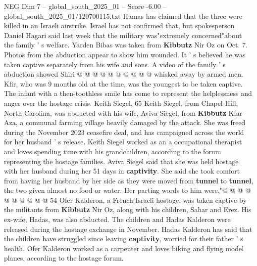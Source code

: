 \begin{textsample}{NEG Dim 7 – global\_south\_2025\_01 – Score -6.00 – global\_south\_2025\_01/120700115.txt}
Hamas has claimed that the three were killed in an Israeli airstrike.
Israel has not confirmed that, but spokesperson Daniel Hagari said last week that the military was"extremely concerned"about the family ' s welfare.
Yarden Bibas was taken from \textbf{Kibbutz} Nir Oz on Oct. 7.
Photos from the abduction appear to show him wounded.
It ' s believed he was taken captive separately from his wife and sons.
A video of the family ' s abduction showed Shiri @ @ @ @ @ @ @ @ @ @ whisked away by armed men.
Kfir, who was 9 months old at the time, was the youngest to be taken captive.
The infant with a then-toothless smile has come to represent the helplessness and anger over the hostage crisis.
Keith Siegel, 65 Keith Siegel, from Chapel Hill, North Carolina, was abducted with his wife, Aviva Siegel, from \textbf{Kibbutz} Kfar Aza, a communal farming village heavily damaged by the attack.
She was freed during the November 2023 ceasefire deal, and has campaigned across the world for her husband ' s release.
Keith Siegel worked as an a occupational therapist and loves spending time with his grandchildren, according to the forum representing the hostage families.
Aviva Siegel said that she was held hostage with her husband during her 51 days in \textbf{captivity}.
She said she took comfort from having her husband by her side as they were moved from \textbf{tunnel} to \textbf{tunnel}, the two given almost no food or water.
Her parting words to him were,"@ @ @ @ @ @ @ @ @ @ 54 Ofer Kalderon, a French-Israeli hostage, was taken captive by the militants from \textbf{Kibbutz} Nir Oz, along with his children, Sahar and Erez.
His ex-wife, Hadas, was also abducted.
The children and Hadas Kalderon were released during the hostage exchange in November.
Hadas Kalderon has said that the children have struggled since leaving \textbf{captivity}, worried for their father ' s health.
Ofer Kalderon worked as a carpenter and loves biking and flying model planes, according to the hostage forum.

\end{textsample}
